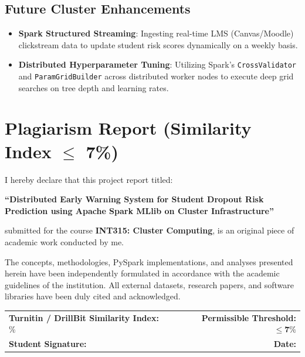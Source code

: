 \documentclass[11pt,a4paper]{article}
\begin{document}
\subsection{Future Cluster Enhancements}
\begin{itemize}
    \item \textbf{Spark Structured Streaming}: Ingesting real-time LMS (Canvas/Moodle) clickstream data to update student risk scores dynamically on a weekly basis.
    \item \textbf{Distributed Hyperparameter Tuning}: Utilizing Spark's \texttt{CrossValidator} and \texttt{ParamGridBuilder} across distributed worker nodes to execute deep grid searches on tree depth and learning rates.
\end{itemize}

\newpage
\section{Plagiarism Report (Similarity Index \texorpdfstring{$\le$}{<=} 7\%)}
\label{sec:plagiarism_report}

\begin{tcolorbox}[colback=white,colframe=black,title=\textbf{ACADEMIC INTEGRITY DECLARATION},arc=2mm]
    \vspace{0.3cm}
    I hereby declare that this project report titled:
    \begin{center}
        \textbf{``Distributed Early Warning System for Student Dropout Risk Prediction using Apache Spark MLlib on Cluster Infrastructure''}
    \end{center}
    submitted for the course \textbf{INT315: Cluster Computing}, is an original piece of academic work conducted by me. 
    
    The concepts, methodologies, PySpark implementations, and analyses presented herein have been independently formulated in accordance with the academic guidelines of the institution. All external datasets, research papers, and software libraries have been duly cited and acknowledged.
    
    \vspace{0.8cm}
    \begin{tabularx}{\linewidth}{X r}
        \textbf{Turnitin / DrillBit Similarity Index:} \underline{\hspace{2.5cm}} \% & \textbf{Permissible Threshold:} $\le \mathbf{7\%}$ \\[0.6cm]
        \textbf{Student Signature:} \underline{\hspace{4.5cm}} & \textbf{Date:} \underline{\hspace{3.5cm}} \\
    \end{tabularx}
    \vspace{0.3cm}
\end{tcolorbox}
\end{document}
